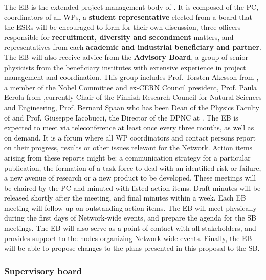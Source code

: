 The EB is the extended project management body of \acronym. It is composed of the PC, 
coordinators of all WPs, a \textbf{student representative} elected from a board that the ESRs will be encouraged to form for their own discussion,
three officers responsible for \textbf{recruitment, diversity and secondment} matters, and representatives from each \textbf{academic and industrial beneficiary and partner}. 
The EB will also receive advice from the \textbf{Advisory Board}, a group of senior physicists from the beneficiary
institutes with extensive experience in project management and coordination. This group includes
Prof. Torsten Akesson from \lund, a member of the Nobel Committee and ex-CERN Council president, 
Prof. Paula Eerola from \helsinki,currently
Chair of the Finnish Research Council for Natural Sciences and Engineering, 
Prof. Bernard Spaan who has been Dean of the Physics Faculty of \dortmund and Prof. Giuseppe Iacobucci, the 
Director of the DPNC at \unigeshort. 
The EB is expected to meet via teleconference at least once every three months, as well as on demand.
It is a forum where all WP coordinators and contact persons report on their progress, results or other
issues relevant for the Network. Action items arising from these reports might be: a 
communication strategy for a particular publication, the formation
of a task force to deal with an identified risk or failure, a new avenue of research
or a new product to be developed. These meetings will be chaired by the PC and %
minuted with listed action items. Draft minutes will be
released shortly after the meeting, and final minutes within a week. 
Each EB meeting will follow up on outstanding action items.
The EB will meet physically during the first days of Network-wide events, and prepare the agenda for the SB meetings. 
The EB will also serve as a point of contact with all \acronym stakeholders, and provides support to the nodes
organizing Network-wide events.
Finally, the EB will be able to propose changes to the plans presented in this proposal to the SB.

\vspace{-2mm}
\subsubsection{Supervisory board}

